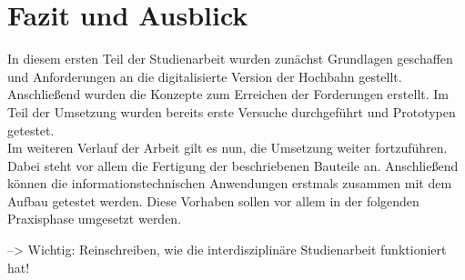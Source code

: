 

\chapter{Fazit und Ausblick}
In diesem ersten Teil der Studienarbeit wurden zunächst Grundlagen geschaffen und Anforderungen an die digitalisierte Version der Hochbahn gestellt. Anschließend wurden die Konzepte zum Erreichen der Forderungen erstellt. Im Teil der Umsetzung wurden bereits erste Versuche durchgeführt und Prototypen getestet.\\

Im weiteren Verlauf der Arbeit gilt es nun, die Umsetzung weiter fortzuführen. Dabei steht vor allem die Fertigung der beschriebenen Bauteile an. Anschließend können die informationstechnischen Anwendungen erstmals zusammen mit dem Aufbau getestet werden. Diese Vorhaben sollen vor allem in der folgenden Praxisphase umgesetzt werden. 

--> Wichtig: Reinschreiben, wie die interdisziplinäre Studienarbeit funktioniert hat!